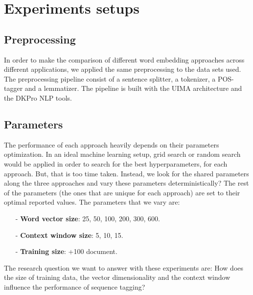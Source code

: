 \documentclass[11pt]{article}
\begin{document}



\section{Experiments setups}

\subsection{Preprocessing}

In order to make the comparison of different word embedding approaches across different applications, we applied the same preprocessing to the data sets used. 
The preprocessing pipeline consist of a sentence splitter, a tokenizer, a POS-tagger and a lemmatizer. The pipeline is built with the UIMA architecture and the DKPro NLP tools. 


\subsection{Parameters}

The performance of each approach heavily depends on their parameters optimization.
In an ideal machine learning setup, grid search or random search would be applied in order to search for the best hyperparameters, for each approach.
But, that is too time taken. Instead, we look for the shared parameters along the three approaches and vary these parameters deterministically? 
The rest of the parameters (the ones that are unique for each approach) are set to  their optimal reported values.
The parameters that we vary are:



\begin{itemize}
\item[-]\textbf{Word vector size}: 25, 50, 100, 200, 300, 600.
\item[-]\textbf{Context window size}: 5, 10, 15.
\item[-]\textbf{Training size}: +100 document.
\end{itemize}

The research question we want to answer with these experiments are: 
How does the size of training data, the vector dimensionality and the context window influence the performance of sequence tagging?
\end{document}
